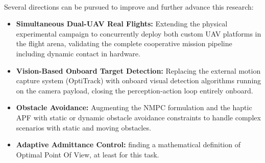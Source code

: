 \\Several directions can be pursued to improve and further advance this research:
\begin{itemize}
    \item \textbf{Simultaneous Dual-UAV Real Flights:} Extending the physical experimental campaign to concurrently deploy both custom UAV platforms in the flight arena, validating the complete cooperative mission pipeline including dynamic contact in hardware.
    \item \textbf{Vision-Based Onboard Target Detection:} Replacing the external motion capture system (OptiTrack) with onboard visual detection algorithms running on the camera payload, closing the perception-action loop entirely onboard.
    \item \textbf{Obstacle Avoidance:} Augmenting the NMPC formulation and the haptic APF with static or dynamic obstacle avoidance constraints to handle complex scenarios with static and moving obstacles.
    \item \textbf{Adaptive Admittance Control:} finding a mathematical definition of Optimal Point Of View, at least for this task.
\end{itemize}

